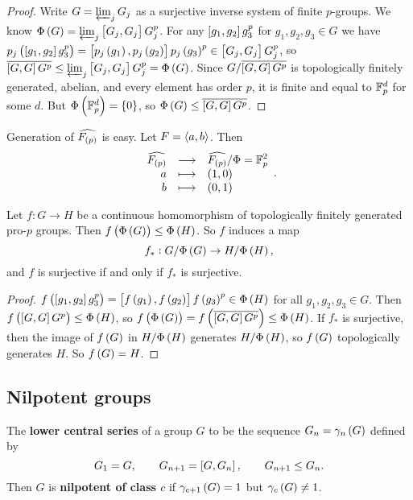 \begin{proof}
Write $ G = \varprojlim_j G_j $ as a surjective inverse system of finite $ p $-groups. We know $ \Phi\br{G} = \varprojlim_j \sbr{G_j, G_j}G_j^p $. For any $ \sbr{g_1, g_2}g_3^p $ for $ g_1, g_2, g_3 \in G $ we have $ p_j\br{\sbr{g_1, g_2}g_3^p} = \sbr{p_j\br{g_1}, p_j\br{g_2}}p_j\br{g_3}^p \in \sbr{G_j, G_j}G_j^p $, so $ \overline{\sbr{G, G}G^p} \le \varprojlim_j \sbr{G_j, G_j}G_j^p = \Phi\br{G} $. Since $ G / \overline{\sbr{G, G}G^p} $ is topologically finitely generated, abelian, and every element has order $ p $, it is finite and equal to $ \mathbb{F}_p^d $ for some $ d $. But $ \Phi\br{\FF_p^d} = \cbr{0} $, so $ \Phi\br{G} \le \overline{\sbr{G, G}G^p} $.
\end{proof}

\begin{example}
Generation of $ \widehat{F_{\br{p}}} $ is easy. Let $ F = \left\langle a, b \right\rangle $. Then
$$ \functions{\widehat{F_{\br{p}}}}{\widehat{F_{\br{p}}} / \Phi = \FF_p^2}{a}{\br{1, 0}}{b}{\br{0, 1}}. $$
\end{example}

\begin{corollary}
Let $ f : G \to H $ be a continuous homomorphism of topologically finitely generated pro-$ p $ groups. Then $ f\br{\Phi\br{G}} \le \Phi\br{H} $. So $ f $ induces a map
$$ f_* : G / \Phi\br{G} \to H / \Phi\br{H}, $$
and $ f $ is surjective if and only if $ f_* $ is surjective.
\end{corollary}

\begin{proof}
$ f\br{\sbr{g_1, g_2}g_3^p} = \sbr{f\br{g_1}, f\br{g_2}}f\br{g_3}^p \in \Phi\br{H} $ for all $ g_1, g_2, g_3 \in G $. Then $ f\br{\sbr{G, G}G^p} \le \Phi\br{H} $, so $ f\br{\Phi\br{G}} = f\br{\overline{\sbr{G, G}G^p}} \le \Phi\br{H} $. If $ f_* $ is surjective, then the image of $ f\br{G} $ in $ H / \Phi\br{H} $ generates $ H / \Phi\br{H} $, so $ f\br{G} $ topologically generates $ H $. So $ f\br{G} = H $.
\end{proof}

\pagebreak

\subsection{Nilpotent groups}


\begin{definition}
The \textbf{lower central series} of a group $ G $ to be the sequence $ G_n = \gamma_n\br{G} $ defined by
$$ G_1 = G, \qquad G_{n + 1} = \sbr{G, G_n}, \qquad G_{n + 1} \le G_n. $$
Then $ G $ is \textbf{nilpotent of class $ c $} if $ \gamma_{c + 1}\br{G} = 1 $ but $ \gamma_c\br{G} \ne 1 $.
\end{definition}

